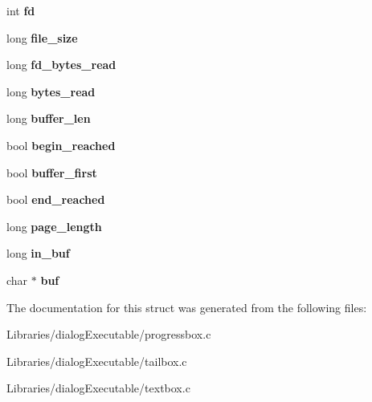 \begin{DoxyCompactItemize}
\item 
int {\bfseries fd}\hypertarget{struct_m_y___o_b_j_a4fa8a70bed72643c1b9f1d56ae5e19ec}{}\label{struct_m_y___o_b_j_a4fa8a70bed72643c1b9f1d56ae5e19ec}

\item 
long {\bfseries file\+\_\+size}\hypertarget{struct_m_y___o_b_j_a7d12f9fb2a6d0e82d68bc921183c7003}{}\label{struct_m_y___o_b_j_a7d12f9fb2a6d0e82d68bc921183c7003}

\item 
long {\bfseries fd\+\_\+bytes\+\_\+read}\hypertarget{struct_m_y___o_b_j_aeeccc68456d5c634fbe18d9d9c7a4cde}{}\label{struct_m_y___o_b_j_aeeccc68456d5c634fbe18d9d9c7a4cde}

\item 
long {\bfseries bytes\+\_\+read}\hypertarget{struct_m_y___o_b_j_ab88b3c7cae3a14bb3b37ee73bd7eb134}{}\label{struct_m_y___o_b_j_ab88b3c7cae3a14bb3b37ee73bd7eb134}

\item 
long {\bfseries buffer\+\_\+len}\hypertarget{struct_m_y___o_b_j_a20266c3ce8e01aec5a5eb35bc0d94e42}{}\label{struct_m_y___o_b_j_a20266c3ce8e01aec5a5eb35bc0d94e42}

\item 
bool {\bfseries begin\+\_\+reached}\hypertarget{struct_m_y___o_b_j_a33c96d8ced60757af867df794bc40c4e}{}\label{struct_m_y___o_b_j_a33c96d8ced60757af867df794bc40c4e}

\item 
bool {\bfseries buffer\+\_\+first}\hypertarget{struct_m_y___o_b_j_a4a50ce3f4e72e32f250c961d1946a818}{}\label{struct_m_y___o_b_j_a4a50ce3f4e72e32f250c961d1946a818}

\item 
bool {\bfseries end\+\_\+reached}\hypertarget{struct_m_y___o_b_j_a8ee62512cabefcf502378e5fa90f80e3}{}\label{struct_m_y___o_b_j_a8ee62512cabefcf502378e5fa90f80e3}

\item 
long {\bfseries page\+\_\+length}\hypertarget{struct_m_y___o_b_j_af1224a72e229a62252ffa0a7e06fc0bf}{}\label{struct_m_y___o_b_j_af1224a72e229a62252ffa0a7e06fc0bf}

\item 
long {\bfseries in\+\_\+buf}\hypertarget{struct_m_y___o_b_j_ac62a29ef6c78d32f13a53aa4fc7a7a9d}{}\label{struct_m_y___o_b_j_ac62a29ef6c78d32f13a53aa4fc7a7a9d}

\item 
char $\ast$ {\bfseries buf}\hypertarget{struct_m_y___o_b_j_a2162e0226ab9ce2687ead680c3d59725}{}\label{struct_m_y___o_b_j_a2162e0226ab9ce2687ead680c3d59725}

\end{DoxyCompactItemize}


The documentation for this struct was generated from the following files\+:\begin{DoxyCompactItemize}
\item 
Libraries/dialog\+Executable/progressbox.\+c\item 
Libraries/dialog\+Executable/tailbox.\+c\item 
Libraries/dialog\+Executable/textbox.\+c\end{DoxyCompactItemize}
